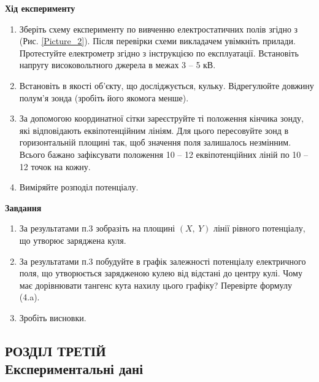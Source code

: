 \documentclass[a4paper,12pt]{article}
\begin{document}
	\newpage
	\begin{center}
		\textbf{Хід експерименту}
	\end{center}
	\begin{enumerate}
		\item  Зберіть схему експерименту по вивченню електростатичних полів згідно з (Рис. \ref{Picture_2}). Після перевірки схеми викладачем увімкніть прилади. Протестуйте електрометр 
		згідно з інструкцією по експлуатації. Встановіть напругу високовольтного джерела в межах 3 – 5 кВ.
		\item Встановіть в якості об’єкту, що досліджується, кульку. Відрегулюйте довжину полум’я зонда (зробіть його якомога менше).
		\item За допомогою координатної сітки зареєструйте ті положення кінчика зонду, які відповідають еквіпотенційним лініям. Для цього пересовуйте зонд в горизонтальній площині так, щоб значення поля залишалось незмінним. Всього бажано зафіксувати положення 10 – 12 еквіпотенційних ліній по 10 – 12 точок на кожну.
		\item Виміряйте розподіл потенціалу.
	\end{enumerate}
	\begin{center}
		\textbf{Завдання}
	\end{center}
	\begin{enumerate}
		\item  За результатами п.3 зобразіть на площині $(X,\:Y)$ лінії рівного потенціалу, що утворює заряджена куля.
		\item За результатами п.3 побудуйте в графік залежності потенціалу електричного поля, що утворюється зарядженою кулею від відстані до центру кулі. Чому має дорівнювати тангенс кута нахилу цього графіку? Перевірте формулу (4.a).
		\item Зробіть висновки.
	\end{enumerate}

\newpage
	\begin{center}
		\section* {РОЗДІЛ ТРЕТІЙ\\Експериментальні дані}
	\end{center}
\end{document}
